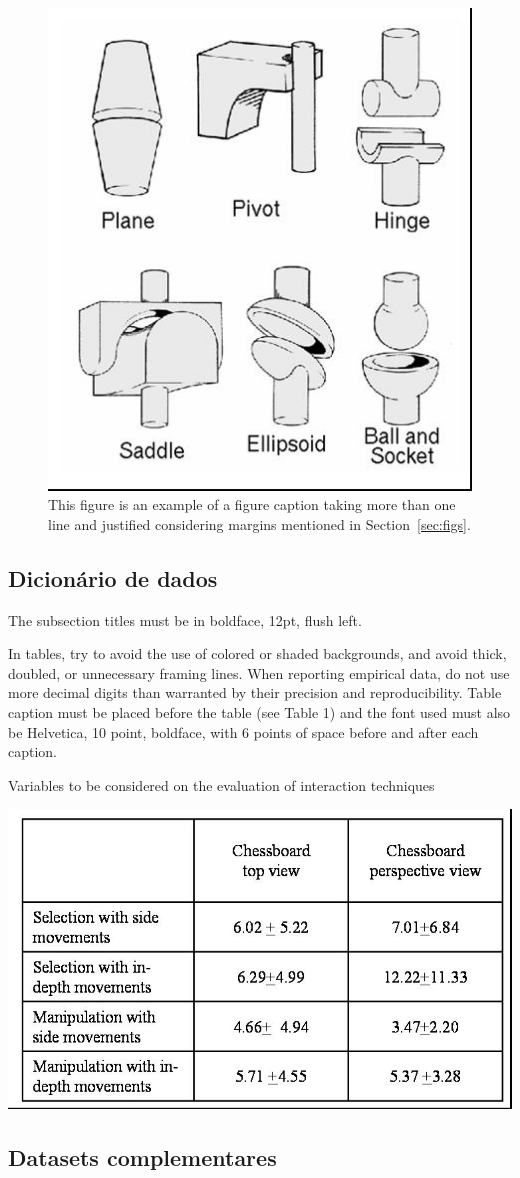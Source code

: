 \documentclass[12pt]{article}
\begin{document}
\begin{figure}[ht]
\centering
\includegraphics[width=.3\textwidth]{fig2.jpg}
\caption{This figure is an example of a figure caption taking more than one
  line and justified considering margins mentioned in Section~\ref{sec:figs}.}
\label{fig:exampleFig2}
\end{figure}

\subsection{Dicionário de dados}

The subsection titles must be in boldface, 12pt, flush left.

In tables, try to avoid the use of colored or shaded backgrounds, and avoid
thick, doubled, or unnecessary framing lines. When reporting empirical data,
do not use more decimal digits than warranted by their precision and
reproducibility. Table caption must be placed before the table (see Table 1)
and the font used must also be Helvetica, 10 point, boldface, with 6 points of
space before and after each caption.

\begin{table}[ht]
\centering
\caption{Variables to be considered on the evaluation of interaction
  techniques}
\label{tab:exTable1}
\includegraphics[width=.7\textwidth]{table.jpg}
\end{table}

\subsection{Datasets complementares}
\end{document}
